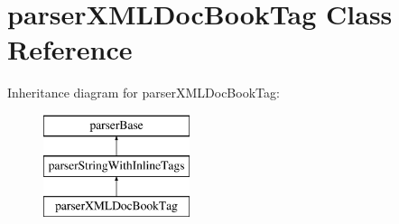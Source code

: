 \hypertarget{classparser_x_m_l_doc_book_tag}{\section{parser\-X\-M\-L\-Doc\-Book\-Tag \-Class \-Reference}
\label{classparser_x_m_l_doc_book_tag}
}
\-Inheritance diagram for parser\-X\-M\-L\-Doc\-Book\-Tag\-:\begin{figure}[H]
\begin{center}
\leavevmode
\includegraphics[height=3.000000cm]{classparser_x_m_l_doc_book_tag}
\end{center}
\end{figure}

